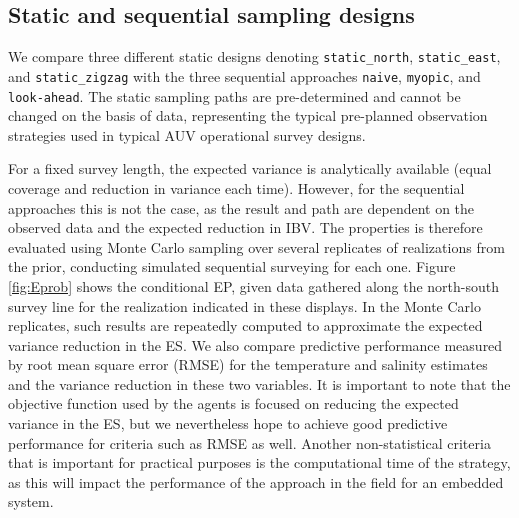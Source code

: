 \documentclass[aoas]{imsart}
\begin{document}
\subsection{Static and sequential sampling designs}\label{sec:sampling_designs}


We compare three different static designs denoting
\texttt{static\_north}, \texttt{static\_east}, and
\texttt{static\_zigzag} with the three sequential approaches
\texttt{naive}, \texttt{myopic}, and \texttt{look-ahead}. The static
sampling paths are pre-determined and cannot be changed on the basis
of data, representing the typical pre-planned observation
strategies used in typical AUV operational survey designs.

For a fixed survey length, the expected variance is analytically available (equal coverage and reduction in variance each time). However, for the sequential approaches this is not the case, as the result and path are dependent on the observed data and the expected reduction in IBV. The properties is therefore evaluated using Monte Carlo sampling over several replicates of realizations from the prior, conducting simulated sequential surveying for each one. Figure \ref{fig:Eprob} shows the conditional EP, given data gathered along the north-south survey line for the realization indicated in these displays. In the Monte Carlo replicates, such results are repeatedly computed to approximate the expected variance reduction in the ES. We also compare predictive performance measured by root mean square error (RMSE) for the temperature and salinity estimates and the variance reduction in these two variables. It is important to note that the objective function used by the agents is focused on reducing the expected variance in the ES, but we nevertheless hope to achieve good predictive performance for criteria such as RMSE as well. Another non-statistical criteria that is important for practical purposes is the computational time of the strategy, as this will impact the performance of the approach in the field for an embedded system. 
\end{document}
